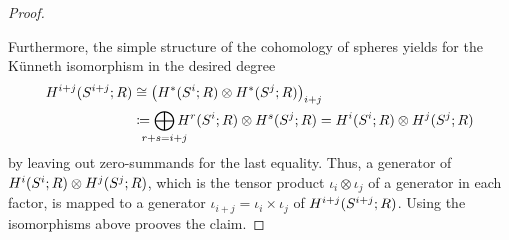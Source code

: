 \begin{Cor}
\begin{proof}
\begin{center}
    \end{center}
    Furthermore, the simple structure of the cohomology of spheres
    yields for the Künneth isomorphism in the desired degree
    \begin{align*}
      H^{i+j}(\Sphere{i+j};R)
      &\cong
        \left(H^*(\Sphere{i}; R)\otimes H^*(\Sphere{j}; R)\right)_{i+j}\\
      &\coloneqq
        \bigoplus_{\mathclap{r+s=i+j}}
        H^r(\Sphere{i};R)\otimes H^s(\Sphere{j};R)
        =
        H^i(\Sphere{i};R)\otimes H^j(\Sphere{j};R)
    \end{align*}
    by leaving out zero-summands for the last equality.
    Thus, a generator of
    $H^i(S^{i}; R)\otimes H^j(S^{j}; R)$,
    which is the tensor product $\iota_i\otimes\iota_j$ of a generator
    in each factor,
    is mapped to a generator $\iota_{i+j}=\iota_i\times\iota_j$ of
    $H^{i+j}(S^{i+j}; R)$.
    Using the isomorphisms above prooves the claim.
  \end{proof}
\end{Cor}

